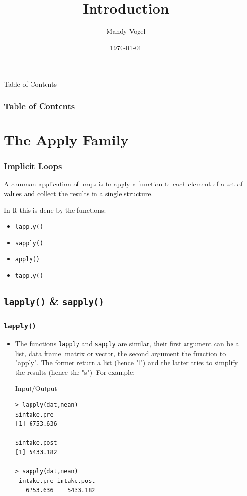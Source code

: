 \documentclass[xcolor={table},c]{beamer}
\begin{document}
\title{Introduction}   
\author{Mandy Vogel} 
\date{\today}


\begin{frame}
\titlepage
\end{frame}

\begin{frame}[allowframebreaks,t]{Table of Contents}
\frametitle{Table of Contents}\tableofcontents
\end{frame}

\section{The Apply Family}
\begin{frame}[fragile]\frametitle{Implicit Loops}
A common application of loops is  to apply a function to each element of a set of values and collect the results in a single structure.

In R this is done by the functions:
\begin{itemize}
 \item \texttt{lapply()}
 \item \texttt{sapply()}
 \item \texttt{apply()}
 \item \texttt{tapply()}
\end{itemize}
\end{frame}

\subsection{\texttt{lapply()} \& \texttt{sapply()}}
\begin{frame}[fragile]\frametitle{\texttt{lapply()}}
\begin{itemize}
\item The functions \texttt{lapply} and \texttt{sapply} are similar, their first argument can be a list, data frame, matrix or vector, the second argument the function to "apply". The former return a list (hence "l") and the latter tries to simplify the results (hence the "s").  For example:
\begin{exampleblock}{Input/Output}\small
\begin{verbatim}
> lapply(dat,mean)
$intake.pre
[1] 6753.636

$intake.post
[1] 5433.182

> sapply(dat,mean)
 intake.pre intake.post
   6753.636    5433.182
\end{verbatim}
\end{exampleblock}

\end{itemize}
\end{frame}
\end{document}
